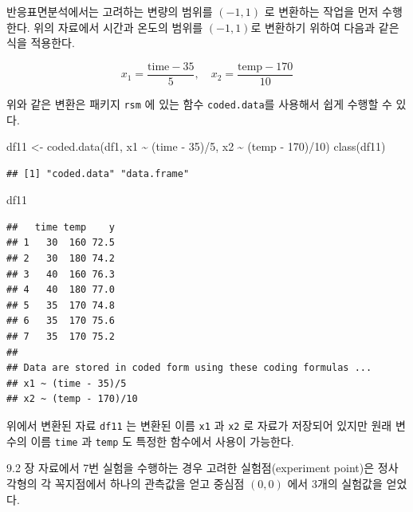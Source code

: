 \documentclass[
]{book}
\newenvironment{Shaded}{\begin{snugshade}}{\end{snugshade}}
\newcommand{\DecValTok}[1]{\textcolor[rgb]{0.00,0.00,0.81}{#1}}
\newcommand{\FunctionTok}[1]{\textcolor[rgb]{0.00,0.00,0.00}{#1}}
\newcommand{\NormalTok}[1]{#1}
\newcommand{\OtherTok}[1]{\textcolor[rgb]{0.56,0.35,0.01}{#1}}
\newcommand{\SpecialCharTok}[1]{\textcolor[rgb]{0.00,0.00,0.00}{#1}}
\theoremstyle{definition}
\theoremstyle{definition}
\theoremstyle{definition}
\theoremstyle{definition}
\theoremstyle{remark}
\begin{document}
반응표면분석에서는 고려하는 변량의 범위를 \((-1,1)\) 로 변환하는 작업을 먼저 수행한다. 위의 자료에서 시간과 온도의 범위를 \((-1,1)\)로 변환하기 위하여 다음과 같은 식을 적용한다.

\[ x_1 = \frac{\text{time} - 35}{5}, \quad x_2 = \frac{\text{temp} - 170}{10} \]

위와 같은 변환은 패키지 \texttt{rsm} 에 있는 함수 \texttt{coded.data}를 사용해서 쉽게 수행할 수 있다.

\begin{Shaded}
\begin{Highlighting}[]
\NormalTok{df11 }\OtherTok{\textless{}{-}} \FunctionTok{coded.data}\NormalTok{(df1, x1 }\SpecialCharTok{\textasciitilde{}}\NormalTok{ (time }\SpecialCharTok{{-}} \DecValTok{35}\NormalTok{)}\SpecialCharTok{/}\DecValTok{5}\NormalTok{, x2 }\SpecialCharTok{\textasciitilde{}}\NormalTok{ (temp }\SpecialCharTok{{-}} \DecValTok{170}\NormalTok{)}\SpecialCharTok{/}\DecValTok{10}\NormalTok{)}
\FunctionTok{class}\NormalTok{(df11)}
\end{Highlighting}
\end{Shaded}

\begin{verbatim}
## [1] "coded.data" "data.frame"
\end{verbatim}

\begin{Shaded}
\begin{Highlighting}[]
\NormalTok{df11 }
\end{Highlighting}
\end{Shaded}

\begin{verbatim}
##   time temp    y
## 1   30  160 72.5
## 2   30  180 74.2
## 3   40  160 76.3
## 4   40  180 77.0
## 5   35  170 74.8
## 6   35  170 75.6
## 7   35  170 75.2
## 
## Data are stored in coded form using these coding formulas ...
## x1 ~ (time - 35)/5
## x2 ~ (temp - 170)/10
\end{verbatim}

위에서 변환된 자료 \texttt{df11} 는 변환된 이름 \texttt{x1} 과 \texttt{x2} 로 자료가 저장되어 있지만 원래 변수의 이름 \texttt{time} 과 \texttt{temp} 도 특정한 함수에서 사용이 가능한다.

9.2 장 자료에서 7번 실험을 수행하는 경우 고려한 실험점(experiment point)은 정사각형의 각 꼭지점에서 하나의 관측값을 얻고 중심점 \((0,0)\) 에서 3개의 실험값을 얻었다.
\end{document}
